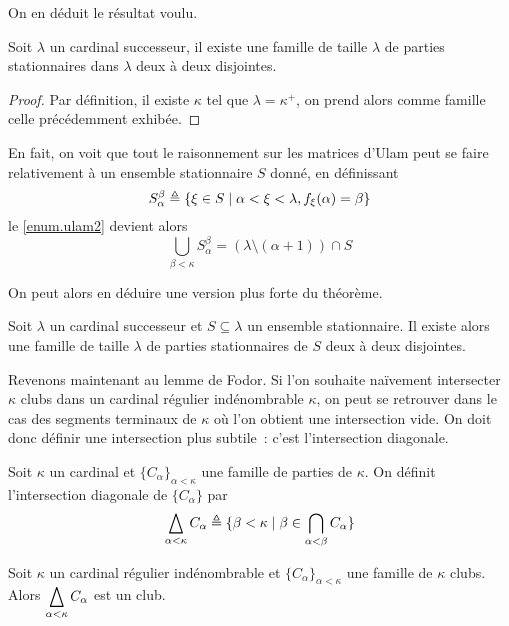 On en déduit le résultat voulu.

\begin{theorem}
  Soit $\lambda$ un cardinal successeur, il existe une famille de taille
  $\lambda$ de parties stationnaires dans $\lambda$ deux à deux disjointes.
\end{theorem}

\begin{proof}
  Par définition, il existe $\kappa$ tel que $\lambda = \kappa^+$, on prend
  alors comme famille celle précédemment exhibée.
\end{proof}

En fait, on voit que tout le raisonnement sur les matrices d'Ulam peut se faire
relativement à un ensemble stationnaire $S$ donné, en définissant
\[S_\alpha^\beta \triangleq \{\xi \in S\mid \alpha < \xi < \lambda,
f_\xi(\alpha) = \beta\}\]
le \cref{enum.ulam2} devient alors
\[\bigcup_{\beta < \kappa} S_\alpha^\beta = (\lambda \setminus (\alpha +1))\cap S\]

On peut alors en déduire une version plus forte du théorème.

\begin{theorem}
  Soit $\lambda$ un cardinal successeur et $S\subseteq\lambda$ un ensemble
  stationnaire. Il existe alors une famille de taille $\lambda$ de parties
  stationnaires de $S$ deux à deux disjointes.
\end{theorem}

Revenons maintenant au lemme de Fodor. Si l'on souhaite naïvement intersecter
$\kappa$ clubs dans un cardinal régulier indénombrable $\kappa$, on peut
se retrouver dans le cas des segments terminaux de $\kappa$ où l'on obtient une
intersection vide. On doit donc définir une intersection plus subtile~: c'est
l'intersection diagonale.

\begin{definition}
  Soit $\kappa$ un cardinal et $\{C_\alpha\}_{\alpha < \kappa}$ une famille de
  parties de $\kappa$. On définit l'intersection diagonale de $\{C_\alpha\}$ par
  \[\bigtriangleup_{\alpha < \kappa} C_\alpha \triangleq \{\beta <\kappa\mid
  \beta\in\bigcap_{\alpha < \beta} C_\alpha\}\]
\end{definition}

\begin{proposition}
  Soit $\kappa$ un cardinal régulier indénombrable et
  $\{C_\alpha\}_{\alpha < \kappa}$ une famille de $\kappa$ clubs. Alors
  $\displaystyle\bigtriangleup_{\alpha < \kappa} C_\alpha$ est un club.
\end{proposition}

